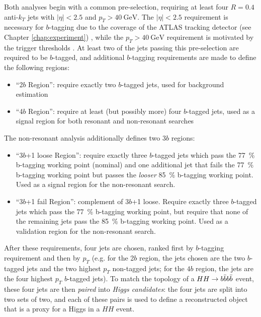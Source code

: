 Both analyses begin with a common pre-selection, requiring at least four $R=0.4$ anti-$k_{T}$ jets with 
$|\eta| < 2.5$ and $p_{T} > \SI{40}{\GeV}$. The $|\eta| < 2.5$ requirement is necessary for $b$-tagging
due to the coverage of the ATLAS tracking detector (see Chapter \ref{chap:experiment}) , 
while the $p_{T} > \SI{40}{\GeV}$ requirement is motivated by the trigger thresholds .
At least two of the jets passing this pre-selection are required to be $b$-tagged, and additional $b$-tagging 
requirements are made to define the following regions:
\begin{itemize}
	\item ``2$b$ Region'': require exactly two $b$-tagged jets, used for background estimation
	\item ``4$b$ Region'': require at least (but possibly more) four $b$-tagged jets, used as a signal
	region for both resonant and non-resonant searches
\end{itemize}

The non-resonant analysis additionally defines two $3b$ regions:
\begin{itemize}
	\item ``3$b$+1 loose Region'': require exactly three $b$-tagged jets which 
	pass the 77~\% b-tagging working point (nominal) and one additional jet that fails the  
	77~\% b-tagging working point but passes the \emph{looser} 85~\% b-tagging working point. Used 
	as a signal region for the non-resonant search.
	\item ``3$b$+1 fail Region'': complement of 3$b$+1 loose. Require exactly three $b$-tagged jets 
	which pass the 77~\% b-tagging working point, but require that none of the remaining jets pass 
	the 85~\% b-tagging working point. Used as a validation region for the non-resonant search.
\end{itemize}
After these requirements, four jets are chosen, ranked first by $b$-tagging requirement and then 
by $p_{T}$ (e.g. for the 2$b$ region, the jets chosen are the two $b$-tagged jets and the two 
highest $p_{T}$ non-tagged jets; for the $4b$ region, the jets are the four highest $p_{T}$ $b$-tagged
jets). To match the topology of a $HH\rightarrow b\bar{b}b\bar{b}$ event, these four jets are then \emph{paired}
into \emph{Higgs candidates}: the four jets are split into two sets of two, and each of these pairs is
used to define a reconstructed object that is a proxy for a Higgs in a $HH$ event.


